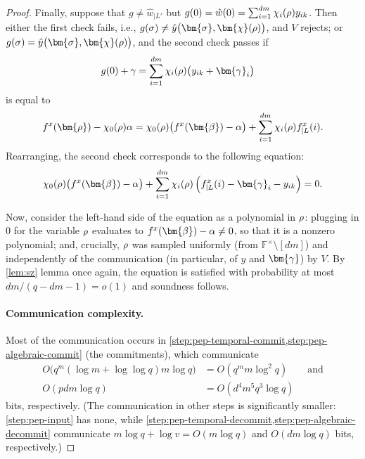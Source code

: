 \documentclass[a4paper,UKenglish,cleveref, autoref, thm-restate]{lipics-v2021}
\theoremstyle{definition}
\newcommand{\field}{\mathbb{F}}
\newcommand{\vcommitlength}{v}
\newcommand{\pcommitlength}{p}
\newcommand{\pcommitstring}{y}
\newcommand{\dimension}{m}
\newcommand{\degree}{d}
\newcommand{\fieldsize}{q}
\newcommand{\evaluationpoint}{\bm{\fe2}}
\newcommand{\fingerprinttuple}{\bm{\rho}}
\newcommand{\Fingerprinttuple}{\bm{\sigma}}
\renewcommand{\line}{L}
\def\fe#1{
    \ifnum#1=1
        \alpha
    \else
    \ifnum#1=2
        \beta
    \else
    \ifnum#1=3
        \gamma
    \fi\fi\fi
}
\def\rfe#1{
    \ifnum#1=1
        \rho
    \else
    \ifnum#1=2
        \sigma
    \else
    \fi\fi
}
\begin{document}
\begin{proof}
    Finally, suppose that $g \neq \hat w_{|\line'}$ but $g(0) = \hat w(0) = \sum_{i = 1}^{\degree\dimension}\chi_i(\rfe1) \pcommitstring_{ik}$. Then either the first check fails, i.e., $g(\rfe2) \neq \hat \pcommitstring\big(\Fingerprinttuple, \bm{\chi}(\rfe1)\big)$, and $V$ rejects; or $g(\rfe2) = \hat \pcommitstring\big(\Fingerprinttuple, \bm{\chi}(\rfe1)\big)$, and the second check passes if
    \begin{align*}
        g(0) + \fe3 &= \sum_{i = 1}^{\degree\dimension}\chi_i(\rfe1)\big( \pcommitstring_{ik} + \bm{\fe3}_i\big)
    \end{align*}
    is equal to
    \begin{equation*}
        f^x(\fingerprinttuple) - \chi_0(\rfe1) \fe1 = \chi_0(\rfe1) \big(f^x(\evaluationpoint) - \fe1\big) + \sum_{i = 1}^{\degree\dimension}\chi_i(\rfe1) f^x_{|\line}(i).
    \end{equation*}
    Rearranging, the second check corresponds to the following equation:
    \begin{equation*}
        \chi_0(\rfe1) \big(f^x(\evaluationpoint) - \fe1\big) + \sum_{i = 1}^{\degree\dimension} \chi_i(\rfe1)\left(f^x_{|\line}(i) - \bm{\fe3}_i - \pcommitstring_{ik}\right) = 0.
    \end{equation*}
    
    Now, consider the left-hand side of the equation as a polynomial in $\rfe1$: plugging in $0$ for the variable $\rfe1$ evaluates to $f^x(\evaluationpoint) - \fe1 \neq 0$, so that it is a nonzero polynomial; and, crucially, $\rfe1$ was sampled uniformly (from $\field^\times \setminus [\degree\dimension]$) and independently of the communication (in particular, of $\pcommitstring$ and $\bm{\fe3}$) by $V$. By \cref{lem:sz} lemma once again, the equation is satisfied with probability at most $\degree\dimension/(\fieldsize - \degree\dimension - 1) = o(1)$ and soundness follows.

    \paragraph*{Communication complexity\iflipics\else.\fi} Most of the communication occurs in \cref{step:pep-temporal-commit,step:pep-algebraic-commit} (the commitments), which communicate
    \begin{align*}
        O\big(\fieldsize^\dimension (\log \dimension + \log\log \fieldsize) \dimension \log \fieldsize\big) &= O\left(\fieldsize^{\dimension} \dimension \log^2 \fieldsize\right) \qquad \text{and}\\
        O\left(\pcommitlength \degree\dimension \log \fieldsize\right) &= O\left(\degree^4\dimension^5\fieldsize^3 \log \fieldsize\right)
    \end{align*}
    bits, respectively. (The communication in other steps is significantly smaller: \cref{step:pep-input} has none, while \cref{step:pep-temporal-decommit,step:pep-algebraic-decommit} communicate $\dimension \log \fieldsize + \log \vcommitlength = O(\dimension \log \fieldsize)$ and $O(\degree\dimension \log \fieldsize)$ bits, respectively.)


\end{proof}
\end{document}
